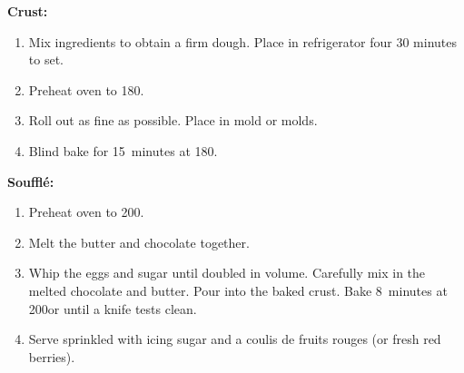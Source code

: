 
\textbf{Crust:}

\begin{ingredients}
\end{ingredients}

\begin{recipe}
  \begin{enumerate}

  \item Mix ingredients to obtain a firm dough.  Place in refrigerator
    four 30 minutes to set.

  \item Preheat oven to 180\degreeC.

  \item Roll out as fine as possible.  Place in mold or molds.

  \item Blind bake for 15~minutes at 180\degreeC.

  \end{enumerate}
\end{recipe}


\textbf{Souffl\'e:}

\begin{ingredients}
\end{ingredients}


\begin{recipe}
  \begin{enumerate}

  \item Preheat oven to 200\degreeC.
    
  \item Melt the butter and chocolate together.

  \item Whip the eggs and sugar until doubled in volume.  Carefully
    mix in the melted chocolate and butter.  Pour into the baked
    crust.  Bake 8~minutes at 200\degreeC or until a knife tests clean.

  \item Serve sprinkled with icing sugar and a coulis de fruits rouges
    (or fresh red berries).

  \end{enumerate}
\end{recipe}
